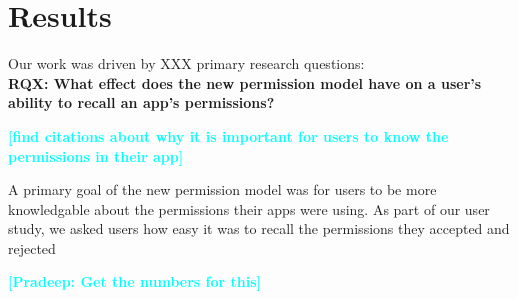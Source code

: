 \documentclass{sig-alternate-05-2015}
\newcommand{\todo}[1]{\textcolor{cyan}{\textbf{[#1]}}}
\begin{document}
\section{Results}



Our work was driven by XXX primary research questions:\\

\textbf{RQX: What effect does the new permission model have on a user's ability to recall an app's permissions?}


\todo{find citations about why it is important for users to know the permissions in their app}




A primary goal of the new permission model was for users to be more knowledgable about the permissions their apps were using. As part of our user study, we asked users how easy it was to recall the permissions they accepted and rejected


\todo{Pradeep: Get the numbers for this} %

\end{document}
